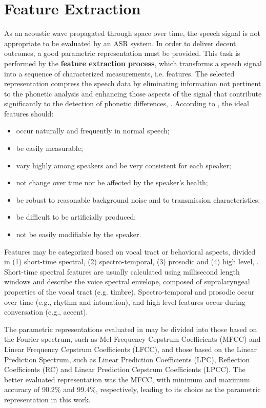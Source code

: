 \chapter{Feature Extraction}
\label{ch:feature-extraction}

As an acoustic wave propagated through space over time, the speech signal is not appropriate to be evaluated by an ASR system. In order to deliver decent outcomes, a good parametric representation must be provided. This task is performed by the \textbf{feature extraction process}, which transforms a speech signal into a sequence of characterized measurements, i.e. features. The selected representation compress the speech data by eliminating information not pertinent to the phonetic analysis and enhancing those aspects of the signal that contribute significantly to the detection of phonetic differences, . According to , the ideal features should:

\begin{itemize}\itemsep0pt
    \item occur naturally and frequently in normal speech;
    \item be easily measurable;
    \item vary highly among speakers and be very consistent for each speaker;
    \item not change over time nor be affected by the speaker's health;
    \item be robust to reasonable background noise and to transmission
    characteristics;
    \item be difficult to be artificially produced;
    \item not be easily modifiable by the speaker.
\end{itemize}

Features may be categorized based on vocal tract or behavioral aspects, divided in (1) short-time spectral, (2) spectro-temporal, (3) prosodic and (4) high level, . Short-time spectral features are usually calculated using millisecond length windows and describe the voice spectral envelope, composed of supralaryngeal properties of the vocal tract (e.g. timbre). Spectro-temporal and prosodic occur over time (e.g., rhythm and intonation), and high level features occur during conversation (e.g., accent).

The parametric representations evaluated in  may be divided into those based on the Fourier spectrum, such as Mel-Frequency Cepstrum Coefficients (MFCC) and Linear Frequency Cepstrum Coefficients (LFCC), and those based on the Linear Prediction Spectrum, such as Linear Prediction Coefficients (LPC), Reflection Coefficients (RC) and Linear Prediction Cepstrum Coefficients (LPCC). The better evaluated representation was the MFCC, with minimum and maximum accuracy of 90.2\% and 99.4\%, respectively, leading to its choice as the parametric representation in this work.

